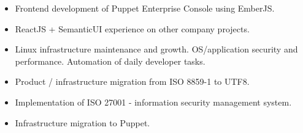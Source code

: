 \documentclass[10pt,a4paper]{altacv}
\begin{document}

\begin{fullwidth}
  \makecvheader
\end{fullwidth}







    \begin{itemize}
      \item Frontend development of Puppet Enterprise Console using EmberJS.
      \item ReactJS + SemanticUI experience on other company projects.
    \end{itemize}
  \divider

    \begin{itemize}
      \item Linux infrastructure maintenance and growth. OS/application security and performance. Automation of daily developer tasks.
      \item Product / infrastructure migration from ISO 8859-1 to UTF8.
      \item Implementation of ISO 27001 - information security management system.
      \item Infrastructure migration to Puppet.
    \end{itemize}
  \divider
\end{document}
